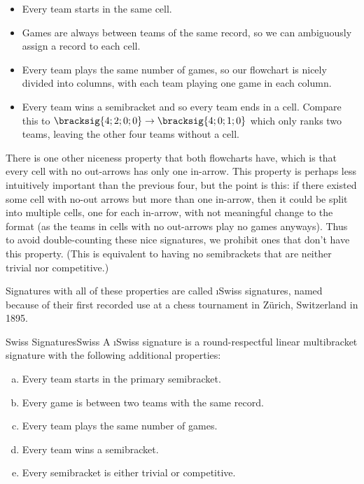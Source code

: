 {    \begin{itemize}
        \item Every team starts in the same cell.
        \item Games are always between teams of the same record, so we can ambiguously assign a record to each cell.
        \item Every team plays the same number of games, so our flowchart is nicely divided into columns, with each team playing one game in each column.
        \item Every team wins a semibracket and so every team ends in a cell. Compare this to $\bracksig{4;2;0;0} \to \bracksig{4;0;1;0}$ which only ranks two teams, leaving the other four teams without a cell.
    \end{itemize}

    There is one other niceness property that both flowcharts have, which is that every cell with no out-arrows has only one in-arrow. This property is perhaps less intuitively important than the previous four, but the point is this: if there existed some cell with no-out arrows but more than one in-arrow, then it could be split into multiple cells, one for each in-arrow, with not meaningful change to the format (as the teams in cells with no out-arrows play no games anyways). Thus to avoid double-counting these nice signatures, we prohibit ones that don't have this property. (This is equivalent to having no semibrackets that are neither trivial nor competitive.)

    Signatures with all of these properties are called \i{Swiss signatures}, named because of their first recorded use at a chess tournament in Zürich, Switzerland in 1895.

    \begin{definition}{Swiss Signatures}{Swiss}
        A \i{Swiss signature} is a round-respectful linear multibracket signature with the following additional properties:
        \begin{enumerate}[(a)]
            \item Every team starts in the primary semibracket.
            \item Every game is between two teams with the same record.
            \item Every team plays the same number of games.
            \item Every team wins a semibracket.
            \item Every semibracket is either trivial or competitive.
        \end{enumerate}
    \end{definition}

}
